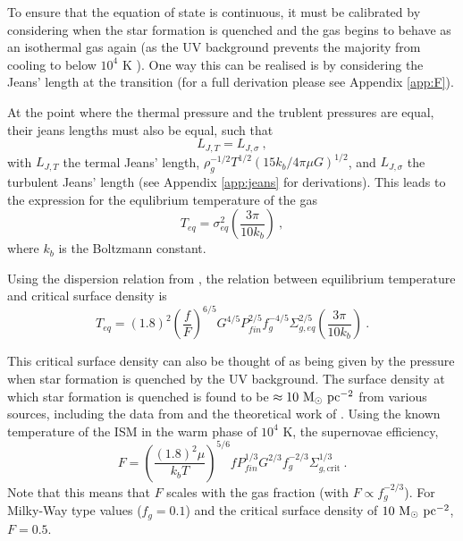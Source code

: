     To ensure that the equation of state is continuous, it must be calibrated by considering when the star formation is quenched and the gas begins to behave as an isothermal gas again (as the UV background prevents the majority from cooling to below $10^4$ K \citep{gnat_time-dependent_2007}).
One way this can be realised is by considering the Jeans' length at the transition (for a full derivation please see Appendix \ref{app:F}).

At the point where the thermal pressure and the trublent pressures are equal, their jeans lengths must also be equal, such that
$$
     L_{J, T} = L_{J, \sigma}~,
$$
with $L_{J, T}$ the termal Jeans' length, $ \rho_g^{-1/2} T^{1/2} \left({15k_b}/{4\pi \mu G}\right)^{1/2} $, and $L_{J, \sigma}$ the turbulent Jeans' length (see Appendix \ref{app:jeans} for derivations).
This leads to the expression for the equlibrium temperature of the gas
\begin{equation}
    T_{eq} = \sigma^2_{eq} \left(\frac{3 \pi}{10 k_b}\right)~,
    \label{eqn:teq}
\end{equation}
where $k_b$ is the Boltzmann constant.

Using the dispersion relation from \citet{martizzi_supernova_2015}, the relation between equilibrium temperature and critical surface density is
$$
T_{eq} = (1.8)^2 \left(\frac{f}{F}\right)^{6/5} G^{4/5} P_{fin}^{2/5} f_g^{-4/5} \Sigma_{g, eq}^{2/5} \left(\frac{3\pi}{10k_b}\right)~.
$$

This critical surface density can also be thought of as being given by the pressure when star formation is quenched by the UV background.
The surface density at which star formation is quenched is found to be $\approx 10 ~\mathrm{M}_{\odot} ~\mathrm{pc}^{-2}$ from various sources, including the data from \citet{bigiel_star_2008} and the theoretical work of \citet{schaye_star_2004}.
Using the known temperature of the ISM in the warm phase of $10^{4}$ K, the supernovae efficiency,
\begin{equation}
    F = \left(\frac{(1.8)^2 \mu}{k_b T}\right)^{5/6} f P_{fin}^{1/3} G^{2/3} f_g^{-2/3} \Sigma_{g, \mathrm{crit}}^{1/3}~.
    \label{eqn:Fcalib}
\end{equation}
Note that this means that $F$ scales with the gas fraction (with $F \propto f_g^{-2/3}$).
For Milky-Way type values ($f_g = 0.1$) and the critical surface density of $10 ~\mathrm{M}_{\odot} ~\mathrm{pc}^{-2}$, $F=0.5$.
